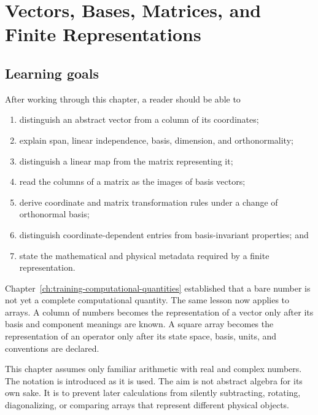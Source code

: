 \chapter{Vectors, Bases, Matrices, and Finite Representations}

\label{ch:training-finite-representations}


\section{Learning goals}

After working through this chapter, a reader should be able to

\begin{enumerate}
  \item distinguish an abstract vector from a column of its coordinates;
  \item explain span, linear independence, basis, dimension, and
        orthonormality;
  \item distinguish a linear map from the matrix representing it;
  \item read the columns of a matrix as the images of basis vectors;
  \item derive coordinate and matrix transformation rules under a change of
        orthonormal basis;
  \item distinguish coordinate-dependent entries from basis-invariant
        properties; and
  \item state the mathematical and physical metadata required by a finite
        representation.
\end{enumerate}

Chapter~\ref{ch:training-computational-quantities} established that a bare
number is not yet a complete computational quantity. The same lesson now
applies to arrays. A column of numbers becomes the representation of a vector
only after its basis and component meanings are known. A square array becomes
the representation of an operator only after its state space, basis, units,
and conventions are declared.

This chapter assumes only familiar arithmetic with real and complex numbers.
The notation is introduced as it is used. The aim is not abstract algebra for
its own sake. It is to prevent later calculations from silently subtracting,
rotating, diagonalizing, or comparing arrays that represent different physical
objects.

